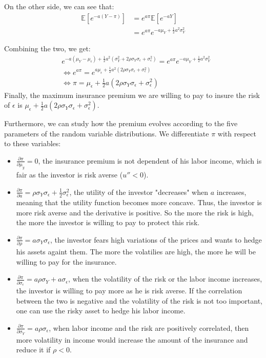 \documentclass[10pt]{article}
\newcommand{\Ebb}{\mathbb{E}}
\newenvironment{exercise}[2][Exercise]{\begin{trivlist}
  \item[\hskip \labelsep {\bfseries #1}\hskip \labelsep {\bfseries #2.}]}{\end{trivlist}}
\begin{document}
\begin{exercise}{1}
On the other side, we can see that:
\begin{align*}
  \Ebb[e^{-a(Y-\pi)}] &= e^{a\pi}\Ebb[e^{-aY}] \\
  &= e^{a\pi}e^{-a\mu_Y + \frac{1}{2}a^2\sigma_Y^2}
\end{align*}
 
Combining the two, we get:
\begin{align*}
  &e^{-a(\mu_Y-\mu_\epsilon) +\frac{1}{2}a^2(\sigma_Y^2 + 2\rho\sigma_Y\sigma_\epsilon + \sigma_\epsilon^2)} = e^{a\pi}e^{-a\mu_Y + \frac{1}{2}a^2\sigma_Y^2}\\
  &\iff e^{a\pi} = e^{a\mu_\epsilon +\frac{1}{2}a^2(2\rho\sigma_Y\sigma_\epsilon + \sigma_\epsilon^2)}\\
  &\iff \pi = \mu_\epsilon + \frac{1}{2}a(2\rho\sigma_Y\sigma_\epsilon + \sigma_\epsilon^2)
\end{align*}
Finally, the maximum insurance premium we are willing to pay to insure the risk of $\epsilon$ is $\mu_\epsilon + \frac{1}{2}a(2\rho\sigma_Y\sigma_\epsilon + \sigma_\epsilon^2)$.

Furthermore, we can study how the premium evolves according to the five parameters of the random variable distributions. 
We differentiate $\pi$ with respect to these variables:
\begin{itemize}
  \item $\frac{\partial\pi}{\partial\mu_y} = 0$, the insurance premium is not dependent of his labor income, which is fair as the investor is risk averse ($u'' <0$).
  \item $\frac{\partial\pi}{\partial a} = \rho\sigma_Y\sigma_\epsilon + \frac{1}{2}\sigma_\epsilon^2$, the utility of the investor "decreases" when $a$ increases, meaning that the utility function becomes more concave. Thus, the investor is more risk averse and the derivative is positive. So the more the risk is high, the more the investor is willing to pay to protect this risk.
  \item $\frac{\partial\pi}{\partial\rho} = a\sigma_Y\sigma_\epsilon$, the investor fears high variations of the prices and wants to hedge his assets againt them. The more the volatilies are high, the more he will be willing to pay for the insurance.
  \item $\frac{\partial\pi}{\partial\sigma_\epsilon} = a\rho\sigma_Y + a\sigma_\epsilon$, when the volatility of the risk or the labor income increases, the investor is willing to pay more as he is risk averse. If the correlation between the two is negative and the volatility of the risk is not too important, one can use the risky asset to hedge his labor income. 
  \item $\frac{\partial\pi}{\partial\sigma_Y} = a\rho\sigma_\epsilon$, when labor income and the risk are positively correlated, then more volatility in income would increase the amount of the insurance and reduce it if $\rho <0$. 
\end{itemize}

  \end{exercise}
\end{document}
